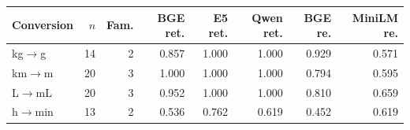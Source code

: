 \begin{tabular}{lrrrrrrr}
\toprule
Conversion & $n$ & Fam. & BGE ret. & E5 ret. & Qwen ret. & BGE re. & MiniLM re. \\
\midrule
kg$\rightarrow$g & 14 & 2 & 0.857 & 1.000 & 1.000 & 0.929 & 0.571 \\
km$\rightarrow$m & 20 & 3 & 1.000 & 1.000 & 1.000 & 0.794 & 0.595 \\
L$\rightarrow$mL & 20 & 3 & 0.952 & 1.000 & 1.000 & 0.810 & 0.659 \\
h$\rightarrow$min & 13 & 2 & 0.536 & 0.762 & 0.619 & 0.452 & 0.619 \\
\bottomrule
\end{tabular}
